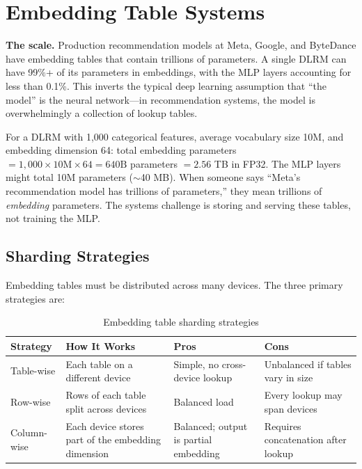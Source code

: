 \section{Embedding Table Systems}
\label{sr:sec:embedding_systems}

\textbf{The scale.} Production recommendation models at Meta, Google, and ByteDance have embedding tables that contain trillions of parameters. A single DLRM can have 99\%+ of its parameters in embeddings, with the MLP layers accounting for less than 0.1\%. This inverts the typical deep learning assumption that ``the model'' is the neural network---in recommendation systems, the model is overwhelmingly a collection of lookup tables.

\begin{keyinsight}
For a DLRM with 1,000 categorical features, average vocabulary size 10M, and embedding dimension 64: total embedding parameters $= 1{,}000 \times 10\text{M} \times 64 = 640\text{B}$ parameters $= 2.56$ TB in FP32. The MLP layers might total 10M parameters ($\sim$40 MB). When someone says ``Meta's recommendation model has trillions of parameters,'' they mean trillions of \textit{embedding} parameters. The systems challenge is storing and serving these tables, not training the MLP.
\end{keyinsight}

\subsection{Sharding Strategies}

Embedding tables must be distributed across many devices. The three primary strategies are:

\begin{table}[H]
\centering
\caption{Embedding table sharding strategies}
\begin{tabularx}{\textwidth}{lXXX}
\toprule
\textbf{Strategy} & \textbf{How It Works} & \textbf{Pros} & \textbf{Cons} \\
\midrule
Table-wise & Each table on a different device & Simple, no cross-device lookup & Unbalanced if tables vary in size \\
Row-wise & Rows of each table split across devices & Balanced load & Every lookup may span devices \\
Column-wise & Each device stores part of the embedding dimension & Balanced; output is partial embedding & Requires concatenation after lookup \\
\bottomrule
\end{tabularx}
\end{table}

